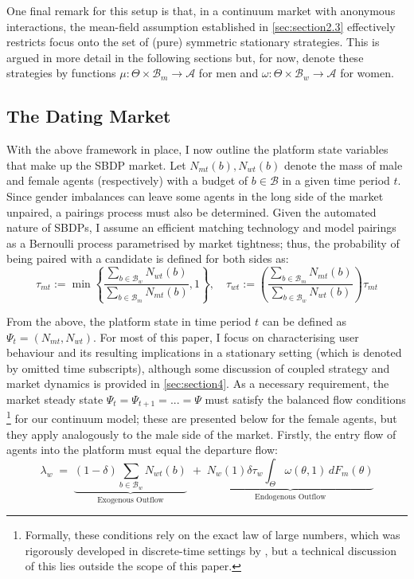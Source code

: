 One final remark for this setup is that, in a continuum market with anonymous interactions, the mean-field assumption established in \autoref{sec:section2.3} effectively restricts focus onto the set of (pure) symmetric stationary strategies. This is argued in more detail in the following sections but, for now, denote these strategies by functions $\mu: \Theta \times\mathcal{B}_m\rightarrow \mathcal{A}$ for men and $\omega:\Theta \times\mathcal{B}_w\rightarrow \mathcal{A}$ for women.

\subsection{The Dating Market}\label{sec:section2.2}
With the above framework in place, I now outline the platform state variables that make up the SBDP market. 
Let $N_{mt}(b), N_{wt}(b)$ denote the mass of male and female agents (respectively) with a budget of $b\in\mathcal{B}$ in a given time period $t$. 
Since gender imbalances can leave some agents in the long side of the market unpaired, a pairings process must also be determined. 
Given the automated nature of SBDPs, I assume an efficient matching technology and model pairings as a Bernoulli process parametrised by market tightness; thus, the probability of being paired with a candidate is defined for both sides as:  
\begin{equation*}
    \tau_{mt}:=\min \left\{\frac{\sum_{b\in\mathcal{B}_w}N_{wt}(b)}{\sum_{b\in\mathcal{B}_m}N_{mt}(b)} , 1 \right\}, 
    \quad \tau_{wt}:= \left(\frac{\sum_{b\in\mathcal{B}_m}N_{mt}(b)}{\sum_{b\in\mathcal{B}_w}N_{wt}(b)} \right) \tau_{mt} 
\end{equation*}

From the above, the platform state in time period $t$ can be defined as $\Psi_t=(N_{mt},N_{wt})$. 
For most of this paper, I focus on characterising user behaviour and its resulting implications in a stationary setting (which is denoted by omitted time subscripts), although some discussion of coupled strategy and market dynamics is provided in \autoref{sec:section4}. 
As a necessary requirement, the market steady state $\Psi_t=\Psi_{t+1}=...=\Psi$ must satisfy the balanced flow conditions \footnote{Formally, these conditions rely on the exact law of large numbers, which was rigorously developed in discrete-time settings by \cite{duffie2018dynamic}, but a technical discussion of this lies outside the scope of this paper.} for our continuum model; these are presented below for the female agents, but they apply analogously to the male side of the market. 
Firstly, the entry flow of agents into the platform must equal the departure flow: 
\begin{equation}\label{eq:ss1} 
    \lambda_w\;=\; \underbrace{ (1-\delta)\sum_{b\in\mathcal{B}_w}N_{wt}(b)}_{\text{Exogenous Outflow}} \;+\; \underbrace{N_w(1) \delta \tau_w\int_{\Theta}\omega(\theta,1)\,dF_{m}(\theta)}_{\text{Endogenous Outflow}} 
\end{equation} 

